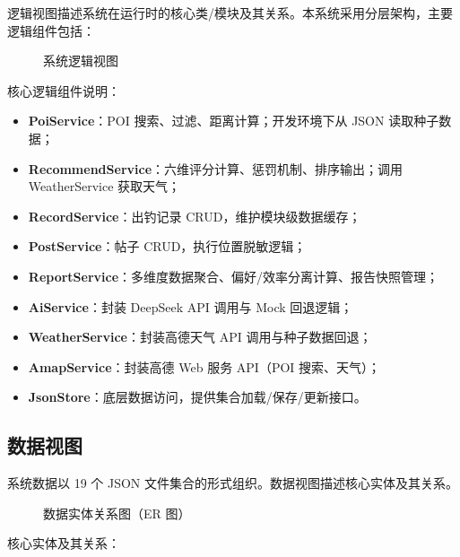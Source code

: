 \documentclass[12pt,a4paper]{ctexart}
\begin{document}
逻辑视图描述系统在运行时的核心类/模块及其关系。本系统采用分层架构，主要逻辑组件包括：

\begin{figure}[H]
  \centering
  \caption{系统逻辑视图}
  \label{fig:logical-view}
\end{figure}

核心逻辑组件说明：
\begin{itemize}
  \item \textbf{PoiService}：POI 搜索、过滤、距离计算；开发环境下从 JSON 读取种子数据；
  \item \textbf{RecommendService}：六维评分计算、惩罚机制、排序输出；调用 WeatherService 获取天气；
  \item \textbf{RecordService}：出钓记录 CRUD，维护模块级数据缓存；
  \item \textbf{PostService}：帖子 CRUD，执行位置脱敏逻辑；
  \item \textbf{ReportService}：多维度数据聚合、偏好/效率分离计算、报告快照管理；
  \item \textbf{AiService}：封装 DeepSeek API 调用与 Mock 回退逻辑；
  \item \textbf{WeatherService}：封装高德天气 API 调用与种子数据回退；
  \item \textbf{AmapService}：封装高德 Web 服务 API（POI 搜索、天气）；
  \item \textbf{JsonStore}：底层数据访问，提供集合加载/保存/更新接口。
\end{itemize}

\subsection{数据视图}

系统数据以 19 个 JSON 文件集合的形式组织。数据视图描述核心实体及其关系。

\begin{figure}[H]
  \centering
  \caption{数据实体关系图（ER 图）}
  \label{fig:er-diagram}
\end{figure}

核心实体及其关系：
\end{document}
